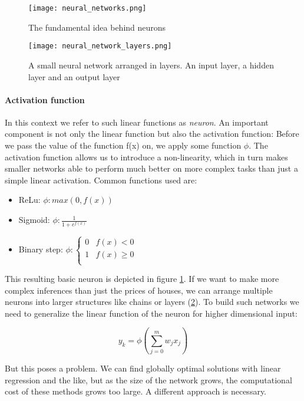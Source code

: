 \begin{figure}
    \centering
    \texttt{[image: neural\_networks.png]}
    \caption{The fundamental idea behind neurons}
    \label{neural_network}
\end{figure}

\begin{figure}
    \centering
    \texttt{[image: neural\_network\_layers.png]}
    \caption{A small neural network arranged in layers. An input layer, a hidden layer and an output layer}
    \label{neural_network_layers}
\end{figure}

\paragraph{Activation function}
In this context we refer to such linear functions as \textit{neuron}. An important component is not only the linear function but also the activation function: Before we pass the value of the function f(x) on, we apply some function $ \phi $. The activation function allows us to introduce a non-linearity, which in turn makes smaller networks able to perform much better on more complex tasks than just a simple linear activation. Common functions used are:
\begin{itemize}
    \item ReLu: $ \phi : max(0, f(x)) $
    \item Sigmoid: $ \phi : \frac{1}{1 + e^{f(x)}} $
    \item Binary step: $ \phi : \begin{cases}
                  0 & f(x) < 0    \\
                  1 & f(x) \geq 0 \\
              \end{cases}$
\end{itemize}

This resulting basic neuron is depicted in figure \ref{neural_network}. If we want to make more complex inferences than just the prices of houses, we can arrange multiple neurons into larger structures like chains or layers (\ref{neural_network_layers}). To build such networks we need to generalize the linear function of the neuron for higher dimensional input:

$$
    y_k = \phi\left(\sum_{j=0}^{m}w_jx_j\right)
$$

But this poses a problem. We can find globally optimal solutions with linear regression and the like, but as the size of the network grows, the computational cost of these methods grows too large. A different approach is necessary.

